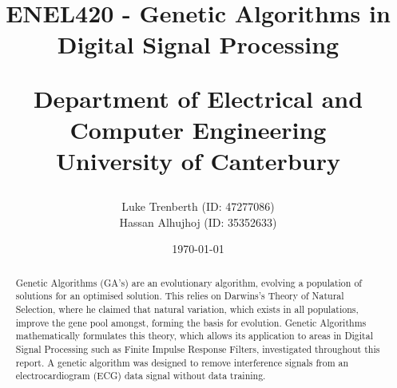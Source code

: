 \documentclass[a4paper, 11pt]{article}
\title{
    ENEL420 - Genetic Algorithms in Digital Signal Processing\\
    \vspace{1cm}
    \begin{large} 
        Department of Electrical and Computer Engineering\\
        University of Canterbury\\
    \end{large}
    \vspace{1cm}
}
\author{
    \small {Luke Trenberth (ID: 47277086)}\\
    \small {Hassan Alhujhoj (ID: 35352633)}\\
    }
\date{\small\today}
\begin{document}
\maketitle

\vspace{4cm}
\begin{abstract}
    Genetic Algorithms (GA's) are an evolutionary algorithm, evolving a population of solutions for an optimised 
    solution. This relies on Darwins's Theory of Natural Selection, where he claimed that natural variation, which exists in
    all populations, improve the gene pool amongst, forming the basis for evolution. Genetic Algorithms mathematically 
    formulates this theory, which allows its application to areas in Digital Signal Processing such as 
    Finite Impulse Response Filters, investigated throughout this report. A genetic algorithm was designed to remove
    interference signals from an electrocardiogram (ECG) data signal without data training. 
    
\end{abstract}

\pagebreak
{}
\tableofcontents
{}
\pagebreak
\end{document}
